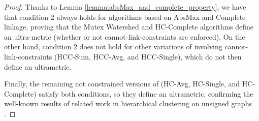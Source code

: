 \begin{proof}
Thanks to Lemma \ref{lemma:absMax_and_complete_property}, we have that condition 2 always holds for algorithms based on AbsMax and Complete linkage, proving that the Mutex Watershed and HC-Complete algorithms define an ultra-metric (whether or not cannot-link-constraints are enforced). On the other hand, condition 2 does not hold for other variations of \algname{} involving cannot-link-constraints (HCC-Sum, HCC-Avg, and HCC-Single), which do not then define an ultrametric. 

Finally, the remaining not constrained versions of \algname{} (HC-Avg, HC-Single, and HC-Complete) satisfy both conditions, so they define an ultrametric, confirming the well-known results of related work in hierarchical clustering on unsigned graphs \cite{johnson1967hierarchical,milligan1979ultrametric}.







\end{proof}

